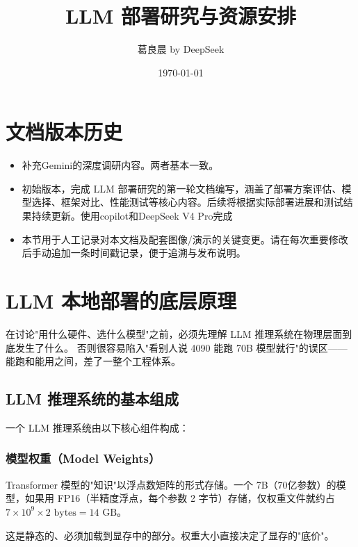 \documentclass[UTF8,a4paper,10pt,oneside]{ctexart}
\title{LLM 部署研究与资源安排}
\author{葛良晨 by DeepSeek }
\date{\today}
\begin{document}
\maketitle

\section*{文档版本历史}
\begin{itemize}
    \item [2026-05-18] 补充Gemini的深度调研内容。两者基本一致。
    \item [2026-05-17] 初始版本，完成 LLM 部署研究的第一轮文档编写，涵盖了部署方案评估、模型选择、框架对比、性能测试等核心内容。后续将根据实际部署进展和测试结果持续更新。使用copilot和DeepSeek V4 Pro完成
    \item [历史记录说明] 本节用于人工记录对本文档及配套图像/演示的关键变更。请在每次重要修改后手动追加一条时间戳记录，便于追溯与发布说明。
\end{itemize}


\section{LLM 本地部署的底层原理}

在讨论"用什么硬件、选什么模型"之前，必须先理解 LLM 推理系统在物理层面到底发生了什么。
否则很容易陷入"看别人说 4090 能跑 70B 模型就行"的误区——能跑和能用之间，差了一整个工程体系。

\subsection{LLM 推理系统的基本组成}

一个 LLM 推理系统由以下核心组件构成：

\subsubsection{模型权重（Model Weights）}

Transformer 模型的"知识"以浮点数矩阵的形式存储。一个 7B（70亿参数）的模型，如果用 FP16（半精度浮点，每个参数 2 字节）存储，仅权重文件就约占 $7 \times 10^9 \times 2 \text{ bytes} = 14\text{ GB}$。

这是静态的、必须加载到显存中的部分。权重大小直接决定了显存的"底价"。
\end{document}
